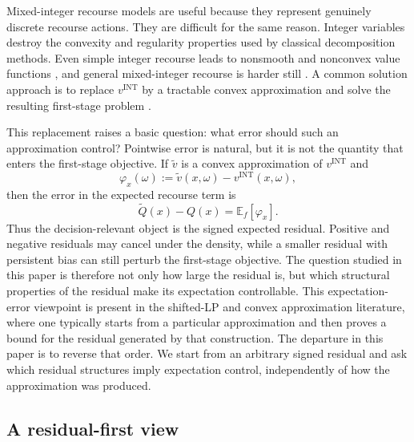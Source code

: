 \documentclass[11pt,letterpaper]{article}
\theoremstyle{definition}
\theoremstyle{remark}
\newcommand{\INT}{\mathrm{INT}}
\begin{document}
Mixed-integer recourse models are useful because they represent genuinely
discrete recourse actions. They are difficult for the same reason. Integer variables destroy the convexity and regularity properties used by
classical decomposition methods. Even simple integer recourse leads to
nonsmooth and nonconvex value functions \cite{vlerk1}, and general
mixed-integer recourse is harder still \cite{schultz2,shapiro}. A common solution approach is to replace
$v^{\INT}$ by a tractable convex approximation and solve the resulting
first-stage problem
\cite{VanderVlerk2004,vanDerLaanEtAl2021}.

This replacement raises a basic question: what error should such an
approximation control? Pointwise error is natural, but it is not the quantity
that enters the first-stage objective. If $\widetilde v$ is a convex
approximation of $v^{\INT}$ and
$$
\varphi_x(\omega):=\widetilde v(x,\omega)-v^{\INT}(x,\omega),
$$
then the error in the expected recourse term is
$$
\widetilde Q(x)-Q(x)=\mathbb E_f[\varphi_x].
$$
Thus the decision-relevant object is the signed expected residual. Positive
and negative residuals may cancel under the density, while a smaller residual
with persistent bias can still perturb the first-stage objective. The question
studied in this paper is therefore not only how large the residual is, but
which structural properties of the residual make its expectation controllable. This expectation-error viewpoint is present in the shifted-LP and convex
approximation literature, where one typically starts from a particular
approximation and then proves a bound for the residual generated by that
construction. The departure in this paper is to reverse that order. We start
from an arbitrary signed residual and ask which residual structures imply
expectation control, independently of how the approximation was produced.

\subsection*{A residual-first view}
\end{document}
